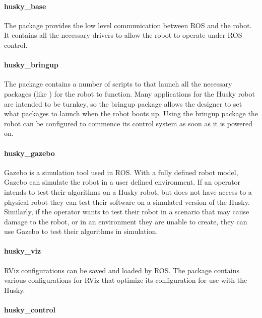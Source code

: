\paragraph{husky\_base}

The  package provides the low level communication between ROS and the robot. It contains all the necessary drivers to allow the robot to operate under ROS control.\\

\paragraph{husky\_bringup}

The  package contains a number of scripts to that launch all the necessary packages (like ) for the robot to function. Many applications for the Husky robot are intended to be turnkey, so the bringup package allows the designer to set what packages to launch when the robot boots up. Using the bringup package the robot can be configured to commence its control system as soon as it is powered on.\\

\paragraph{husky\_gazebo}

Gazebo is a simulation tool used in ROS. With a fully defined robot model, Gazebo can simulate the robot in a user defined environment. If an operator intends to test their algorithms on a Husky robot, but does not have access to a physical robot they can test their software on a simulated version of the Husky. Similarly, if the operator wants to test their robot in a scenario that may cause damage to the robot, or in an environment they are unable to create, they can use Gazebo to test their algorithms in simulation.\\

\paragraph{husky\_viz}

RViz configurations can be saved and loaded by ROS. The  package contains various configurations for RViz that optimize its configuration for use with the Husky.\\

\paragraph{husky\_control}

